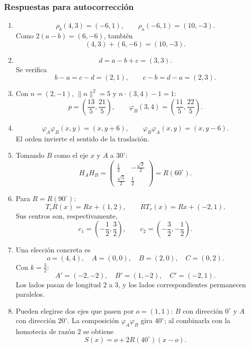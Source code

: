 \subsubsection{Respuestas para autocorrección}

\begin{enumerate}
  \item
  \[
  \rho_b(4,3)=(-6,1),\qquad
  \rho_a(-6,1)=(10,-3).
  \]
  Como \(2(a-b)=(6,-6)\), también
  \[
    (4,3)+(6,-6)=(10,-3).
  \]

  \item
  \[
    d=a-b+c=(3,3).
  \]
  Se verifica
  \[
  b-a=c-d=(2,1),
  \qquad
  c-b=d-a=(2,3).
  \]

  \item Con \(n=(2,-1)\), \(\lVert n\rVert^2=5\) y
  \(n\cdot(3,4)-1=1\):
  \[
  p=\left(\frac{13}{5},\frac{21}{5}\right),
  \qquad
  \varphi_B(3,4)=
  \left(\frac{11}{5},\frac{22}{5}\right).
  \]

  \item
  \[
  \varphi_A\varphi_B(x,y)=(x,y+6),
  \qquad
  \varphi_B\varphi_A(x,y)=(x,y-6).
  \]
  El orden invierte el sentido de la traslación.

  \item Tomando \(B\) como el eje \(x\) y \(A\) a \(30^\circ\):
  \[
  H_AH_B=
  \begin{pmatrix}
  \frac12&-\frac{\sqrt3}{2}\\
  \frac{\sqrt3}{2}&\frac12
  \end{pmatrix}
  =R(60^\circ).
  \]

  \item Para \(R=R(90^\circ)\):
  \[
  T_vR(x)=Rx+(1,2),
  \qquad
  RT_v(x)=Rx+(-2,1).
  \]
  Sus centros son, respectivamente,
  \[
    c_1=\left(-\frac12,\frac32\right),
    \qquad
    c_2=\left(-\frac32,-\frac12\right).
  \]

  \item Una elección concreta es
  \[
  o=(4,4),\quad
  A=(0,0),\quad B=(2,0),\quad C=(0,2).
  \]
  Con \(k=\frac32\):
  \[
  A'=(-2,-2),\quad B'=(1,-2),\quad C'=(-2,1).
  \]
  Los lados pasan de longitud \(2\) a \(3\), y los lados correspondientes permanecen
  paralelos.

  \item Pueden elegirse dos ejes que pasen por \(o=(1,1)\): \(B\) con dirección
  \(0^\circ\) y \(A\) con dirección \(20^\circ\). La composición
  \(\varphi_A\varphi_B\) gira \(40^\circ\); al combinarla con la homotecia de razón \(2\)
  se obtiene
  \[
    S(x)=o+2R(40^\circ)(x-o).
  \]
\end{enumerate}

